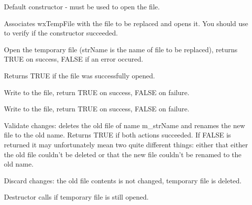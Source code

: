 


\label{wxtempfilewxtempfilector}

Default constructor -  must be used to open the
file.

\label{wxtempfilewxtempfile}

Associates wxTempFile with the file to be replaced and opens it. You should use
 to verify if the constructor succeeded.

\label{wxtempfileopen}

Open the temporary file (strName is the name of file to be replaced), returns
TRUE on success, FALSE if an error occured.

\label{wxtempfileisopened}

Returns TRUE if the file was successfully opened.

\label{wxtempfilewrite}

Write to the file, return TRUE on success, FALSE on failure.

\label{wxtempfilewrites}

Write to the file, return TRUE on success, FALSE on failure.

\label{wxtempfilecommit}

Validate changes: deletes the old file of name m\_strName and renames the new
file to the old name. Returns TRUE if both actions succeeded. If FALSE is
returned it may unfortunately mean two quite different things: either that
either the old file couldn't be deleted or that the new file couldn't be renamed
to the old name.

\label{wxtempfilediscard}

Discard changes: the old file contents is not changed, temporary file is
deleted.

\label{wxtempfiledtor}

Destructor calls  if temporary file
is still opened.

